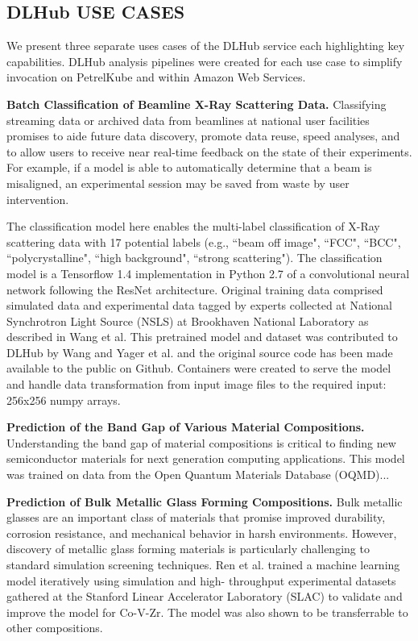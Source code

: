 \documentclass{aip-cp}
\newcommand\ben[1]{}
\newcommand\ben[1]{{\color{blue}[Ben: #1]}}
\begin{document}
\subsection{DLHub USE CASES}
We present three separate uses cases of the DLHub service each highlighting
key capabilities. DLHub analysis pipelines were created for each
use case to simplify invocation on PetrelKube and within Amazon Web Services.
\ben{refine and add based on other paper components and DLHub architecture section}

\textbf{Batch Classification of Beamline X-Ray Scattering Data.}
Classifying streaming data or archived data from beamlines at national user
facilities promises to aide future data discovery, promote data reuse, speed
analyses, and to allow users to receive near real-time feedback on the state
of their experiments. For example, if a model is able to automatically
determine that a beam is misaligned, an experimental session may be saved from
waste by user intervention.

The classification model here enables the multi-label classification of X-Ray
scattering data with 17 potential labels (e.g., ``beam off image", ``FCC",
``BCC", ``polycrystalline", ``high background", ``strong scattering"). The
classification model is a Tensorflow 1.4 implementation in Python 2.7 of a
convolutional neural network following the ResNet architecture. Original
training data comprised simulated data and experimental data tagged by experts
collected at National Synchrotron Light Source (NSLS) at Brookhaven National
Laboratory as described in Wang et al. This pretrained model and dataset was
contributed to DLHub by Wang and Yager et al. and the original source code has
been made available to the public on Github. Containers were created to serve
the model and handle data transformation from input image files to the
required input: 256x256 numpy arrays.

\ben{Add DLHub usage details here}


\textbf{Prediction of the Band Gap of Various Material Compositions.}
Understanding the band gap of material compositions is critical
to finding new semiconductor materials for next generation computing
applications. This model was trained on data from the Open Quantum Materials
Database (OQMD)...
\ben{More model details}
\ben{Add DLHub usage details here}

\textbf{Prediction of Bulk Metallic Glass Forming Compositions.}
Bulk metallic glasses are an important class of materials that promise
improved durability, corrosion resistance, and mechanical behavior in harsh
environments. However, discovery of metallic glass forming materials is
particularly challenging to standard simulation screening techniques. Ren et
al. trained a machine learning model iteratively using simulation and high-
throughput experimental datasets gathered at the Stanford Linear Accelerator
Laboratory (SLAC) to validate and improve the model for Co-V-Zr. The model was
also shown to be transferrable to other compositions.
\end{document}
